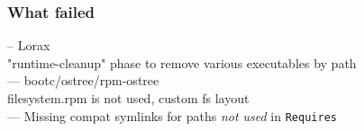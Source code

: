 \documentclass[]{beamer}
\newcommand\pp{}
\begin{document}
\begin{frame}[fragile]
  \frametitle{What failed}

  \pp
  – Lorax\\
  "runtime-cleanup" phase to remove various executables by path
  \\\pp

  — bootc/ostree/rpm-ostree\\
  filesystem.rpm is not used, custom fs layout
  \\\pp


  — Missing compat symlinks for paths \textit{not used} in \texttt{Requires}


\end{frame}
\end{document}
